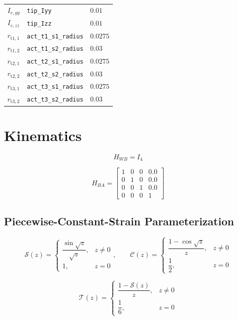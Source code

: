 \documentclass[11pt]{article}
\newcommand{\Sfun}{\mathcal{S}}
\newcommand{\Cfun}{\mathcal{C}}
\newcommand{\Tfun}{\mathcal{T}}
\begin{document}
\begin{longtable}{lll}
$I_{e,yy}$ & \texttt{tip\_Iyy} & $0.01$ \\
$I_{e,zz}$ & \texttt{tip\_Izz} & $0.01$ \\
$r_{\mathrm{t1},1}$ & \texttt{act\_t1\_s1\_radius} & $0.0275$ \\
$r_{\mathrm{t1},2}$ & \texttt{act\_t1\_s2\_radius} & $0.03$ \\
$r_{\mathrm{t2},1}$ & \texttt{act\_t2\_s1\_radius} & $0.0275$ \\
$r_{\mathrm{t2},2}$ & \texttt{act\_t2\_s2\_radius} & $0.03$ \\
$r_{\mathrm{t3},1}$ & \texttt{act\_t3\_s1\_radius} & $0.0275$ \\
$r_{\mathrm{t3},2}$ & \texttt{act\_t3\_s2\_radius} & $0.03$ \\
\hline
\end{longtable}

\section{Kinematics}
\begin{equation}
H_{WB}=I_4
\end{equation}

\begin{equation}
H_{BA}=\begin{bmatrix}1 & 0 & 0 & 0.0\\0 & 1 & 0 & 0.0\\0 & 0 & 1 & 0.0\\0 & 0 & 0 & 1\end{bmatrix}\label{eq:mount-transform}
\end{equation}

\subsection{Piecewise-Constant-Strain Parameterization}
\begin{equation}
\Sfun(z)=\begin{cases}\dfrac{\sin\sqrt z}{\sqrt z},&z\ne0\\1,&z=0\end{cases},\qquad \Cfun(z)=\begin{cases}\dfrac{1-\cos\sqrt z}{z},&z\ne0\\\dfrac12,&z=0\end{cases}
\end{equation}

\begin{equation}
\Tfun(z)=\begin{cases}\dfrac{1-\Sfun(z)}{z},&z\ne0\\\dfrac16,&z=0\end{cases}
\end{equation}
\end{document}
